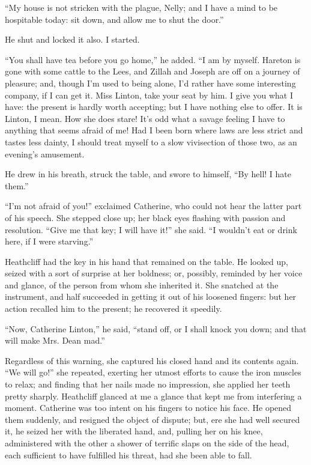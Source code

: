 \par “My house is not stricken with the plague, Nelly; and I have a mind to be hospitable today: sit down, and allow me to shut the door.”
\par He shut and locked it also. I started.
\par “You shall have tea before you go home,” he added. “I am by myself. Hareton is gone with some cattle to the Lees, and Zillah and Joseph are off on a journey of pleasure; and, though I'm used to being alone, I'd rather have some interesting company, if I can get it. Miss Linton, take your seat by him. I give you what I have: the present is hardly worth accepting; but I have nothing else to offer. It is Linton, I mean. How she does stare! It's odd what a savage feeling I have to anything that seems afraid of me! Had I been born where laws are less strict and tastes less dainty, I should treat myself to a slow vivisection of those two, as an evening's amusement.
\par He drew in his breath, struck the table, and swore to himself, “By hell! I hate them.”
\par “I'm not afraid of you!” exclaimed Catherine, who could not hear the latter part of his speech. She stepped close up; her black eyes flashing with passion and resolution. “Give me that key; I will have it!” she said. “I wouldn't eat or drink here, if I were starving.”
\par Heathcliff had the key in his hand that remained on the table. He looked up, seized with a sort of surprise at her boldness; or, possibly, reminded by her voice and glance, of the person from whom she inherited it. She snatched at the instrument, and half succeeded in getting it out of his loosened fingers: but her action recalled him to the present; he recovered it speedily.
\par “Now, Catherine Linton,” he said, “stand off, or I shall knock you down; and that will make Mrs. Dean mad.”
\par Regardless of this warning, she captured his closed hand and its contents again. “We will go!” she repeated, exerting her utmost efforts to cause the iron muscles to relax; and finding that her nails made no impression, she applied her teeth pretty sharply. Heathcliff glanced at me a glance that kept me from interfering a moment. Catherine was too intent on his fingers to notice his face. He opened them suddenly, and resigned the object of dispute; but, ere she had well secured it, he seized her with the liberated hand, and, pulling her on his knee, administered with the other a shower of terrific slaps on the side of the head, each sufficient to have fulfilled his threat, had she been able to fall.
